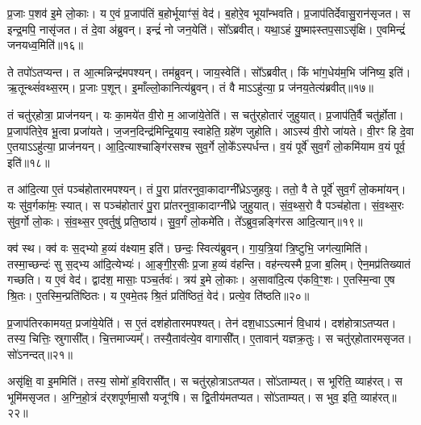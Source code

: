 प्र॒जाः प॒शव॑ इ॒मे लो॒काः।
य ए॒वं प्र॒जा\-प॑तिं ब॒होर्भूयाꣳ॑सं॒ वेद॑।
ब॒होरे॒व भूया᳚न्भवति।
प्र॒जा\-प॑तिर्देवासु॒रान॑\-सृजत।
स इन्द्र॒मपि॒ नासृ॑जत।
तं दे॒वा अ॑ब्रुवन्।
इन्द्रं॑ नो जन॒येति॑।
सो᳚ऽब्रवीत्।
यथा॒ऽहं यु॒ष्माꣴस्तप॒सा\-ऽसृ॑क्षि।
ए॒वमिन्द्रं॑ जनयध्व॒मिति॑॥१६॥

ते तपो॑\-ऽतप्यन्त।
त आ॒त्मन्निन्द्र॑मपश्यन्।
तम॑ब्रुवन्।
जाय॒स्वेति॑।
सो᳚ऽब्रवीत्।
किं भा॑ग॒धेय॑म॒भि ज॑निष्य॒ इति॑।
ऋ॒तून्थ्सं॑वथ्स॒रम्।
प्र॒जाः प॒शून्।
इ॒माँल्लो॒कानित्य॑ब्रुवन्।
तं वै माऽऽहु॑त्या॒ प्र ज॑नय॒तेत्य॑ब्रवीत्॥१७॥

तं चतु॑र्‌\mbox{}होत्रा॒ प्राज॑नयन्।
यः का॒मये॑त वी॒रो म॒ आजा॑ये॒तेति॑।
स चतु॑र्‌\mbox{}होतारं जुहुयात्।
प्र॒जा\-प॑ति॒र्वै चतु॑र्\mbox{}होता।
प्र॒जा\-प॑तिरे॒व भू॒त्वा प्रजा॑यते।
ज॒जन॒दिन्द्र॑मिन्द्रि॒याय॒ स्वाहेति॒ ग्रहे॑ण जुहोति।
आऽस्य॑ वी॒रो जा॑यते।
वी॒रꣳ हि दे॒वा ए॒तया\-ऽऽहु॑त्या॒ प्राज॑नयन्।
आ॒दि॒त्याश्चाङ्गि॑रसश्च सुव॒र्गे लो॒के᳚\-ऽस्पर्धन्त।
व॒यं पूर्वे॑ सुव॒र्गं लो॒कमि॑याम व॒यं पूर्व॒ इति॑॥१८॥

त आ॑दि॒त्या ए॒तं पञ्च॑होतारमपश्यन्।
तं पु॒रा प्रा॑तरनु\-वा॒कादाग्नी᳚ध्रे\-ऽजुहवुः।
ततो॒ वै ते पूर्वे॑ सुव॒र्गं लो॒कमा॑यन्।
यः सु॑व॒र्गका॑मः॒ स्यात्।
स पञ्च॑होतारं पु॒रा प्रा॑तरनु\-वा॒का\-दाग्नी᳚ध्रे जुहुयात्।
सं॒व॒थ्स॒रो वै पञ्च॑होता।
सं॒व॒थ्स॒रः सु॑व॒र्गो लो॒कः।
सं॒व॒थ्स॒र ए॒वर्तुषु॑ प्रति॒ष्ठाय॑।
सु॒व॒र्गं लो॒कमे॑ति।
ते᳚ऽब्रुव॒न्नङ्गि॑रस आदि॒त्यान्॥१९॥

क्व॑ स्थ।
क्व॑ वः स॒द्भ्यो ह॒व्यं व॑क्ष्याम॒ इति॑।
छन्दः॒ स्वित्य॑ब्रुवन्।
गा॒य॒त्रि॒यां त्रि॒ष्टुभि॒ जग॑त्या॒मिति॑।
तस्मा॒च्छन्दः॑ सु स॒द्भ्य आ॑दि॒त्येभ्यः॑।
आ॒ङ्गी॒र॒सीः प्र॒जा ह॒व्यं व॑हन्ति।
वह॑न्त्यस्मै प्र॒जा ब॒लिम्।
ऐन॒मप्र॑तिख्यातं गच्छति।
य ए॒वं वेद॑।
द्वाद॑श॒ मासाः॒ पञ्च॒र्तवः॑।
त्रय॑ इ॒मे लो॒काः।
अ॒सावा॑दि॒त्य ए॑कवि॒ꣳ॒शः।
ए॒तस्मि॒न्वा ए॒ष श्रि॒तः।
ए॒तस्मि॒न्प्रति॑\-ष्ठितः।
य ए॒वमे॒तꣴ श्रि॒तं प्रति॑\-ष्ठितं॒ वेद॑।
प्रत्ये॒व ति॑ष्ठति॥२०॥\anuvakamend[स्या॒दिति॑ संवथ्स॒रो ज॑नयध्व॒मितीत्य॑ब्रवी॒त्पूर्व॒ इत्या॑दि॒त्यानृ॒तवः॒ षट्च॑]

प्र॒जा\-प॑तिरकामयत॒ प्रजा॑ये॒येति॑।
स ए॒तं दश॑होतारमपश्यत्।
तेन॑ दश॒धा\-ऽऽत्मानं॑ वि॒धाय॑।
दश॑होत्रा\-ऽतप्यत।
तस्य॒ चित्तिः॒ स्रुगासी᳚त्।
चि॒त्तमाज्यम्᳚।
तस्यै॒ताव॑त्ये॒व वागासी᳚त्।
ए॒तावान्॑ यज्ञक्र॒तुः।
स चतु॑र्‌\mbox{}होतारम\-सृजत।
सो॑ऽनन्दत्॥२१॥

असृ॑क्षि॒ वा इ॒ममिति॑।
तस्य॒ सोमो॑ ह॒विरासी᳚त्।
स चतु॑र्‌\mbox{}होत्रा\-ऽतप्यत।
सो॑ऽताम्यत्।
स भूरिति॒ व्याह॑रत्।
स भूमि॑म\-सृजत।
अ॒ग्नि॒हो॒त्रं द॑र्‌\mbox{}शपूर्णमा॒सौ यजूꣳ॑षि।
स द्वि॒तीय॑मतप्यत।
सो॑ऽताम्यत्।
स भुव॒ इति॒ व्याह॑रत्॥२२॥

